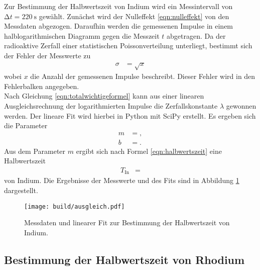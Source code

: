 Zur Bestimmung der Halbwertszeit von Indium wird ein Messintervall von $\increment t = \SI{220}{\second}$ gewählt.
Zunächst wird der Nulleffekt \eqref{eqn:nulleffekt} von den Messdaten abgezogen.
Daraufhin werden die gemessenen Impulse in einem halblogarithmischen Diagramm gegen die Messzeit $t$ abgetragen.
Da der radioaktive Zerfall einer statistischen Poissonverteilung unterliegt, bestimmt sich der Fehler der Messwerte zu
\begin{align*}
  \sigma &= \sqrt{x}
\end{align*}
wobei $x$ die Anzahl der gemessenen Impulse beschreibt.
Dieser Fehler wird in den Fehlerbalken angegeben.\\
Nach Gleichung \eqref{eqn:totalwichtigeformel} kann aus einer linearen Ausgleichsrechnung der logarithmierten Impulse die Zerfallskonstante $\lambda$ gewonnen werden.
Der lineare Fit wird hierbei in Python mit SciPy erstellt.
Es ergeben sich die Parameter
\begin{align*}
  m &= , \\
  b &= .
\end{align*}
Aus dem Parameter $m$ ergibt sich nach Formel \eqref{eqn:halbwertszeit} eine Halbwertszeit
\begin{align*}
  T_\text{In} &= 
\end{align*}
von Indium.
Die Ergebnisse der Messwerte und des Fits sind in Abbildung \ref{fig:plot1} dargestellt.

\begin{figure}
  \centering
  \texttt{[image: build/ausgleich.pdf]}
  \caption{Messdaten und linearer Fit zur Bestimmung der Halbwertszeit von Indium.}
  \label{fig:plot1}
\end{figure}

\subsection{Bestimmung der Halbwertszeit von Rhodium}
